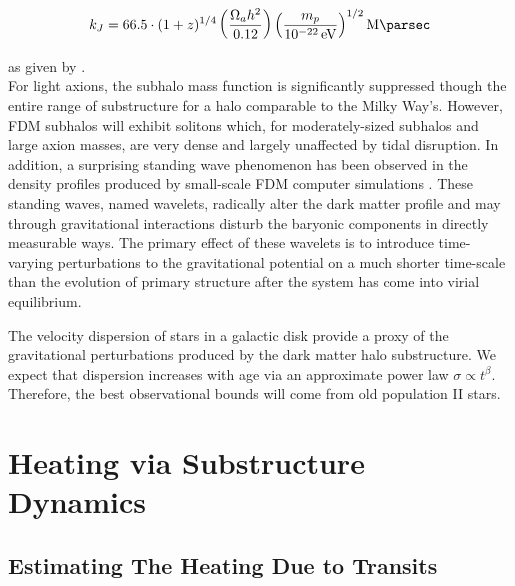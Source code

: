 \documentclass[usenatbib]{mnras}
\newcommand{\poweV}[1]{\SI{e#1}{\electronvolt}}
\begin{document}
\begin{equation}
k_J = 66.5 \cdot (1+z)^{1/4} \left( \frac{\Omega_a h^2}{0.12} \right) \left(\frac{m_p}{\poweV{-22}} \right)^{1/2} \si{\per\mega\parsec}
\end{equation}

as given by \citet{axion_cosmology}. \\ For light axions, the subhalo mass function is significantly suppressed though the entire range of substructure for a halo comparable to the Milky Way’s. However, FDM subhalos will exhibit solitons which, for moderately-sized subhalos and large axion masses, are very dense and largely unaffected by tidal disruption. In addition, a surprising standing wave phenomenon has been observed in the density profiles produced by small-scale FDM computer simulations \citep{cold_and_fuzzy}. These standing waves, named wavelets, radically alter the dark matter profile and may through gravitational interactions disturb the baryonic components in directly measurable ways. The primary effect of these wavelets is to introduce time-varying perturbations to the gravitational potential on a much shorter time-scale than the evolution of primary structure after the system has come into virial equilibrium. 
\par
	The velocity dispersion of stars in a galactic disk provide a proxy of the gravitational perturbations produced by the dark matter halo substructure. We expect that dispersion increases with age via an approximate power law $\sigma \propto t^\beta$. Therefore, the best observational bounds will come from old population II stars.  

\section{Heating via Substructure Dynamics}

\subsection{Estimating The Heating Due to Transits}
\end{document}
